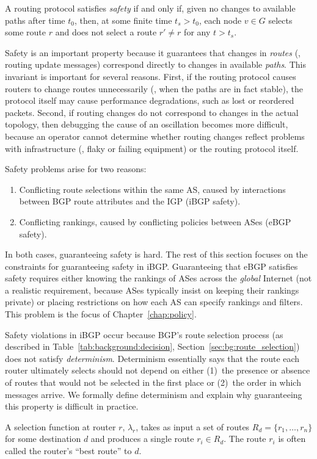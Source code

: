 \begin{defn}[Safety]
A routing protocol satisfies {\em safety} if and only if, given no
changes to available paths after time $t_0$, then, at some finite time
$t_s > t_0$, each node $v\in G$ selects some route $r$ and does not
select a route $r'\neq r$ for any $t > t_s$.
\end{defn}

Safety is an important property because it guarantees that changes in
{\em routes} (\ie, routing update messages) correspond directly to
changes in available {\em paths}.  This invariant is important for
several reasons.  First, if the routing protocol causes routers to
change routes unnecessarily (\ie, when the paths are in fact stable),
the protocol itself may cause performance degradations, such as lost or
reordered packets.  Second, if routing changes do not correspond to
changes in the actual topology, then debugging the cause of an
oscillation becomes more difficult, because an operator cannot determine
whether routing changes reflect problems with infrastructure (\eg, flaky
or failing equipment) or the routing protocol itself.

Safety problems arise for two reasons:
\begin{enumerate}
\itemsep=-1pt
\item Conflicting route selections within the same AS, caused by
  interactions between BGP route attributes and the IGP (iBGP safety).
\item Conflicting rankings, caused by conflicting policies between
  ASes (eBGP safety).
\end{enumerate}
In both cases, guaranteeing safety is hard.  The
rest of this section focuses on the constraints for guaranteeing safety
in iBGP.  Guaranteeing that eBGP satisfies safety requires either 
knowing the rankings of ASes across the {\em global} Internet (not
a realistic requirement, because ASes typically insist on keeping their
rankings private) or placing restrictions on how each AS can specify
rankings and filters.  This problem is the focus of
Chapter~\ref{chap:policy}.

Safety violations in iBGP occur because BGP's route selection process
(as described in Table~\ref{tab:background:decision},
Section~\ref{sec:bg:route_selection}) does 
not satisfy {\em determinism}.  Determinism essentially says that the
route each router ultimately selects should not depend on either 
(1)~the presence or absence of routes
that would not be selected in the first place or
(2)~the
order in which messages arrive.  We formally define
determinism and explain why guaranteeing this property is difficult in
practice.
\begin{defn}
A selection function at router $r$, $\lambda_r$, takes as input a set of
routes $R_d = \{r_1, \ldots, r_n\}$ for some destination $d$ and produces
a single route $r_i \in R_d$.  The route $r_i$ is often called the
router's ``best route'' to $d$.
\end{defn}

